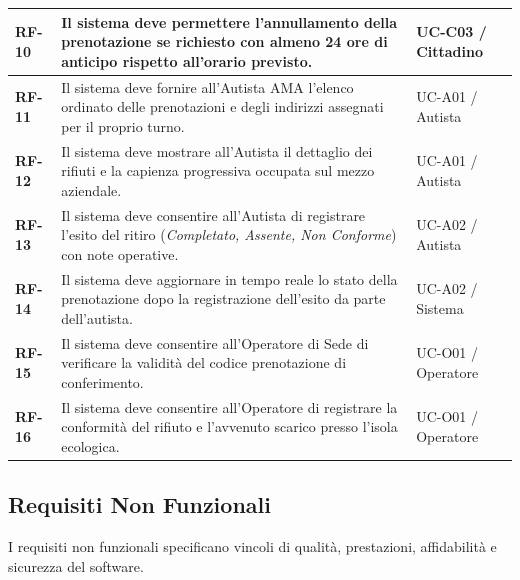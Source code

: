 \begin{center}
\begin{longtable}{|p{2cm}|p{8cm}|p{5cm}|}
\textbf{RF-10} & Il sistema deve permettere l'annullamento della prenotazione se richiesto con almeno 24 ore di anticipo rispetto all'orario previsto. & UC-C03 / Cittadino \\ \hline

\textbf{RF-11} & Il sistema deve fornire all'Autista AMA l'elenco ordinato delle prenotazioni e degli indirizzi assegnati per il proprio turno. & UC-A01 / Autista \\ \hline

\textbf{RF-12} & Il sistema deve mostrare all'Autista il dettaglio dei rifiuti e la capienza progressiva occupata sul mezzo aziendale. & UC-A01 / Autista \\ \hline

\textbf{RF-13} & Il sistema deve consentire all'Autista di registrare l'esito del ritiro (\textit{Completato, Assente, Non Conforme}) con note operative. & UC-A02 / Autista \\ \hline

\textbf{RF-14} & Il sistema deve aggiornare in tempo reale lo stato della prenotazione dopo la registrazione dell'esito da parte dell'autista. & UC-A02 / Sistema \\ \hline

\textbf{RF-15} & Il sistema deve consentire all'Operatore di Sede di verificare la validità del codice prenotazione di conferimento. & UC-O01 / Operatore \\ \hline

\textbf{RF-16} & Il sistema deve consentire all'Operatore di registrare la conformità del rifiuto e l'avvenuto scarico presso l'isola ecologica. & UC-O01 / Operatore \\ \hline
\end{longtable}
\end{center}

\subsection{Requisiti Non Funzionali}
I requisiti non funzionali specificano vincoli di qualità, prestazioni, affidabilità e sicurezza del software.

